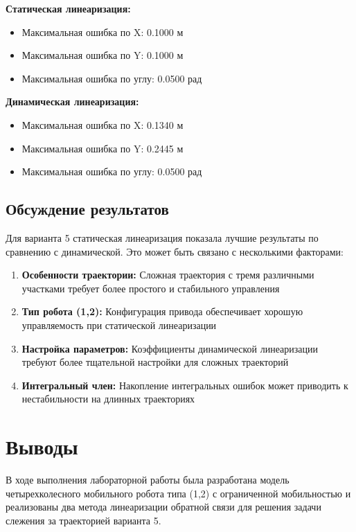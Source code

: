 \textbf{Статическая линеаризация:}
\begin{itemize}
\item Максимальная ошибка по X: 0.1000 м
\item Максимальная ошибка по Y: 0.1000 м
\item Максимальная ошибка по углу: 0.0500 рад
\end{itemize}

\textbf{Динамическая линеаризация:}
\begin{itemize}
\item Максимальная ошибка по X: 0.1340 м
\item Максимальная ошибка по Y: 0.2445 м
\item Максимальная ошибка по углу: 0.0500 рад
\end{itemize}

\subsection{Обсуждение результатов}

Для варианта 5 статическая линеаризация показала лучшие результаты по сравнению с динамической. Это может быть связано с несколькими факторами:

\begin{enumerate}
\item \textbf{Особенности траектории:} Сложная траектория с тремя различными участками требует более простого и стабильного управления
\item \textbf{Тип робота (1,2):} Конфигурация привода обеспечивает хорошую управляемость при статической линеаризации
\item \textbf{Настройка параметров:} Коэффициенты динамической линеаризации требуют более тщательной настройки для сложных траекторий
\item \textbf{Интегральный член:} Накопление интегральных ошибок может приводить к нестабильности на длинных траекториях
\end{enumerate}

\section{Выводы}

В ходе выполнения лабораторной работы была разработана модель четырехколесного мобильного робота типа (1,2) с ограниченной мобильностью и реализованы два метода линеаризации обратной связи для решения задачи слежения за траекторией варианта 5.

